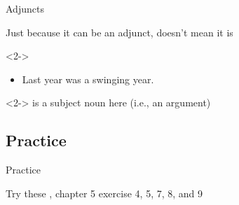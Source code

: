 \documentclass{beamer}
\newcommand{\subonefive}{Adjuncts}
\newcommand{\subonesix}{Practice}
\begin{document}
      \begin{frame}{\subonefive}
        \begin{alertblock}{}
          Just because it can be an adjunct, doesn't mean it is
        \end{alertblock}
        \begin{example}<2->
          \begin{itemize}
            \item Last year was a swinging year.
          \end{itemize}
        \end{example}
        \begin{block}<2->{}
           is a subject noun here (i.e., an argument)
        \end{block}
      \end{frame}


    \subsection{\subonesix}
      \begin{frame}{\subonesix}
        \begin{block}{Try these}
          \textcite{dawson_language_2016}, chapter 5 exercise 4, 5, 7, 8, and 9
        \end{block}
      \end{frame}
\end{document}

